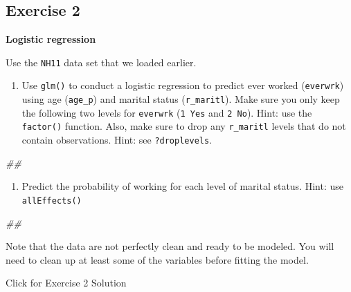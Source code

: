 \documentclass[
]{book}
\newenvironment{Shaded}{\begin{snugshade}}{\end{snugshade}}
\newcommand{\CommentTok}[1]{\textcolor[rgb]{0.56,0.35,0.01}{\textit{#1}}}
\providecommand{\tightlist}{%
  \setlength{\itemsep}{0pt}\setlength{\parskip}{0pt}}
\begin{document}
\hypertarget{exercise-2}{%
\subsection{Exercise 2}\label{exercise-2}}

\textbf{Logistic regression}

Use the \texttt{NH11} data set that we loaded earlier.

\begin{enumerate}
\def\labelenumi{\arabic{enumi}.}
\tightlist
\item
  Use \texttt{glm()} to conduct a logistic regression to predict ever worked (\texttt{everwrk}) using age (\texttt{age\_p}) and marital status (\texttt{r\_maritl}). Make sure you only keep the following two levels for \texttt{everwrk} (\texttt{1\ Yes} and \texttt{2\ No}). Hint: use the \texttt{factor()} function. Also, make sure to drop any \texttt{r\_maritl} levels that do not contain observations. Hint: see \texttt{?droplevels}.
\end{enumerate}

\begin{Shaded}
\begin{Highlighting}[]
\CommentTok{\#\# }
\end{Highlighting}
\end{Shaded}

\begin{enumerate}
\def\labelenumi{\arabic{enumi}.}
\setcounter{enumi}{1}
\tightlist
\item
  Predict the probability of working for each level of marital status. Hint: use \texttt{allEffects()}
\end{enumerate}

\begin{Shaded}
\begin{Highlighting}[]
\CommentTok{\#\# }
\end{Highlighting}
\end{Shaded}

Note that the data are not perfectly clean and ready to be modeled. You will need to clean up at least some of the variables before fitting the model.

{Click for Exercise 2 Solution}
\end{document}

